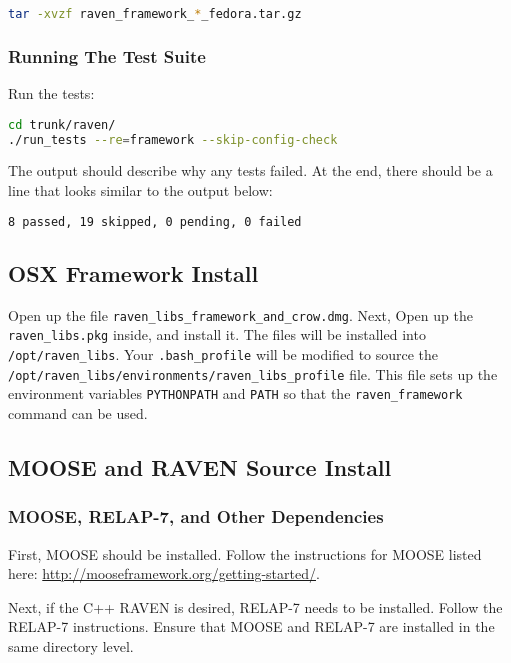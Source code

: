 \begin{lstlisting}[language=bash]
tar -xvzf raven_framework_*_fedora.tar.gz
\end{lstlisting}

\subsubsection{Running The Test Suite}
Run the tests:

\begin{lstlisting}[language=bash]
cd trunk/raven/
./run_tests --re=framework --skip-config-check
\end{lstlisting}

The output should describe why any tests failed.
%
At the end, there should be a line that looks similar to the output below:
\begin{lstlisting}[language=bash]
8 passed, 19 skipped, 0 pending, 0 failed
\end{lstlisting}

\subsection{OSX Framework Install}

Open up the file \texttt{raven\_libs\_framework\_and\_crow.dmg}.
%
Next, Open up the \texttt{raven\_libs.pkg} inside, and install it.
%
The files will be installed into \texttt{/opt/raven\_libs}.
%
Your \texttt{.bash\_profile} will be modified to source the
\texttt{/opt/raven\_libs/environments/raven\_libs\_profile} file.
%
This file sets up the environment variables \texttt{PYTHONPATH} and
\texttt{PATH} so that the \texttt{raven\_framework} command can be used.

\subsection{MOOSE and RAVEN Source Install}

\subsubsection{MOOSE, RELAP-7, and Other Dependencies}
First, MOOSE should be installed.  Follow the instructions for MOOSE listed
here: \url{http://mooseframework.org/getting-started/}.

Next, if the C++ RAVEN is desired, RELAP-7 needs to be installed.
%
Follow the RELAP-7 instructions.  
Ensure that MOOSE and RELAP-7 are installed in the same directory level.

